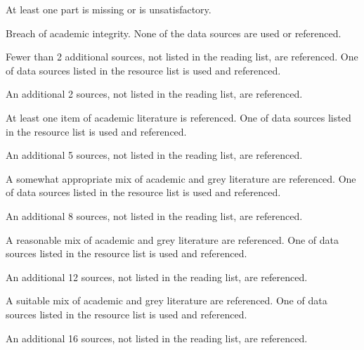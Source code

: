 \documentclass{../../fal_assignment}
\begin{document}
\begin{markingrubric}
%
		\grade\fail At least one part is missing or is unsatisfactory.
        \par Breach of academic integrity.
%
        \grade\fail	None of the data sources are used or referenced.
        \par			Fewer than 2 additional sources, not listed in the reading list, are referenced.
        \grade		One of data sources listed in the resource list is used and referenced.
        \par			An additional 2 sources, not listed in the reading list, are referenced.
        \par			At least one item of academic literature is referenced.
        \grade		One of data sources listed in the resource list is used and referenced.
        \par			An additional 5 sources, not listed in the reading list, are referenced.
        \par			A somewhat appropriate mix of academic and grey literature are referenced.
        \grade		One of data sources listed in the resource list is used and referenced.
        \par			An additional 8 sources, not listed in the reading list, are referenced.
        \par			A reasonable mix of academic and grey literature are referenced.
        \grade		One of data sources listed in the resource list is used and referenced.
        \par			An additional 12 sources, not listed in the reading list, are referenced.
        \par			A suitable mix of academic and grey literature are referenced.
        \grade		One of data sources listed in the resource list is used and referenced.
        \par			An additional 16 sources, not listed in the reading list, are referenced.

\end{markingrubric}
\end{document}
